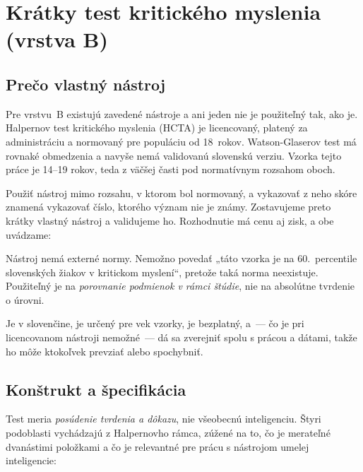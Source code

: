 \chapter{Krátky test kritického myslenia (vrstva B)}
\label{chapter:kriticke-myslenie}

\section{Prečo vlastný nástroj}

Pre vrstvu~B existujú zavedené nástroje a ani jeden nie je použiteľný tak, ako je. Halpernov test kritického myslenia (HCTA) je licencovaný, platený za administráciu a normovaný pre populáciu od 18~rokov. Watson\--Glaserov test má rovnaké obmedzenia a navyše nemá validovanú slovenskú verziu. Vzorka tejto práce je 14--19 rokov, teda z väčšej časti pod normatívnym rozsahom oboch.

Použiť nástroj mimo rozsahu, v ktorom bol normovaný, a vykazovať z neho skóre znamená vykazovať číslo, ktorého význam nie je známy. Zostavujeme preto krátky vlastný nástroj a validujeme ho. Rozhodnutie má cenu aj zisk, a obe uvádzame:

\begin{description}[leftmargin=0.6cm, nosep]
    \item[\textbf{Cena.}] Nástroj nemá externé normy. Nemožno povedať „táto vzorka je na 60.~percentile slovenských žiakov v kritickom myslení“, pretože taká norma neexistuje. Použiteľný je na \emph{porovnanie podmienok v rámci štúdie}, nie na absolútne tvrdenie o úrovni.
    \item[\textbf{Zisk.}] Je v slovenčine, je určený pre vek vzorky, je bezplatný, a~--- čo je pri licencovanom nástroji nemožné~--- dá sa zverejniť spolu s prácou a dátami, takže ho môže ktokoľvek prevziať alebo spochybniť.
\end{description}

\section{Konštrukt a špecifikácia}

Test meria \emph{posúdenie tvrdenia a dôkazu}, nie všeobecnú inteligenciu. Štyri podoblasti vychádzajú z Halpernovho rámca, zúžené na to, čo je merateľné dvanástimi položkami a čo je relevantné pre prácu s nástrojom umelej inteligencie:

